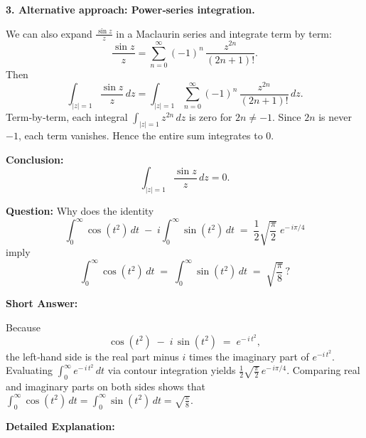 \documentclass[12pt]{article}
\theoremstyle{definition} %
\theoremstyle{plain} %
\begin{document}
\textbf{3. Alternative approach: Power‐series integration.}

We can also expand \(\frac{\sin z}{z}\) in a Maclaurin series and integrate term by term:
\[
\frac{\sin z}{z}
= \sum_{n=0}^{\infty} (-1)^n \,\frac{z^{2n}}{(2n+1)!}.
\]
Then
\[
\int_{\lvert z\rvert=1} \frac{\sin z}{z}\,dz
= \int_{\lvert z\rvert=1} 
\sum_{n=0}^{\infty} (-1)^n \,\frac{z^{2n}}{(2n+1)!}\,dz.
\]
Term‐by‐term, each integral
\(\displaystyle \int_{\lvert z\rvert=1} z^{2n}\,dz\)
is zero for \(2n \neq -1\). Since \(2n\) is never \(-1\), each term vanishes. Hence the entire sum integrates to \(0\).

\textbf{Conclusion:}
\[
\boxed{
\int_{\lvert z\rvert=1} \frac{\sin z}{z}\,dz = 0.
}
\]

\textbf{Question:} 
Why does the identity
\[
\int_{0}^{\infty}\cos(t^2)\,dt \;-\; i \int_{0}^{\infty}\sin(t^2)\,dt
\;=\;
\frac{1}{2}\sqrt{\frac{\pi}{2}}\;e^{-\,i\pi/4}
\]
imply
\[
\int_{0}^{\infty}\cos(t^2)\,dt
\;=\;
\int_{0}^{\infty}\sin(t^2)\,dt
\;=\;
\sqrt{\frac{\pi}{8}}\,?
\]

\textbf{Short Answer:} 

Because 
\[
\cos(t^2) \;-\; i\,\sin(t^2) \;=\; e^{-\,i\,t^2},
\]
the left‐hand side is the real part minus \(i\) times the imaginary part of \(e^{-i\,t^2}\).  Evaluating 
\(\displaystyle \int_0^\infty e^{-\,i\,t^2}\,dt\)
via contour integration yields
\(\displaystyle \frac12 \sqrt{\frac{\pi}{2}}\,e^{-\,i\pi/4}.\)
Comparing real and imaginary parts on both sides shows that
\(\displaystyle \int_{0}^{\infty}\cos(t^2)\,dt = \int_{0}^{\infty}\sin(t^2)\,dt = \sqrt{\frac{\pi}{8}}.\)

\bigskip

\textbf{Detailed Explanation:}
\end{document}
